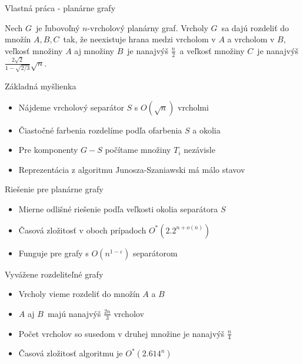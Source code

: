 \documentclass[slovak]{beamer}
\begin{document}
\begin{frame}{Vlastná práca - planárne grafy}
    \begin{theorem}
        Nech $G$ je ľubovoľný $n$-vrcholový planárny graf. Vrcholy $G$ sa dajú rozdeliť
        do množín $A, B, C$ tak, že neexistuje hrana medzi vrcholom v $A$ a vrcholom v $B$,
        veľkosť množiny $A$ aj množiny $B$ je nanajvýš $\frac{n}{2}$ a veľkosť množiny $C$ je nanajvýš
        $\frac{2\sqrt{2}}{1 - \sqrt{2/3}} \sqrt{n}$.
    \end{theorem}
\end{frame}

\begin{frame}{Základná myšlienka}
    \begin{itemize}
        \item Nájdeme vrcholový separátor $S$ s $O(\sqrt{n})$ vrcholmi
        \item Čiastočné farbenia rozdelíme podľa ofarbenia $S$ a okolia
        \item Pre komponenty $G - S$ počítame množiny $T_i$ nezávisle
        \item Reprezentácia z algoritmu Junosza-Szaniawski má málo stavov
    \end{itemize}
\end{frame}

\begin{frame}{Riešenie pre planárne grafy}
    \begin{itemize}
        \item Mierne odlišné riešenie podľa veľkosti okolia separátora $S$
        \item Časová zložitosť v oboch prípadoch $O^*(2.2^{n + o(n)})$
        \item Funguje pre grafy s $O(n^{1 - \varepsilon})$ separátorom
    \end{itemize}
\end{frame}

\begin{frame}{Vyvážene rozdeliteľné grafy}
    \begin{itemize}
        \item Vrcholy vieme rozdeliť do množín $A$ a $B$
        \item $A$ aj $B$ majú nanajvýš $\frac{2n}{3}$ vrcholov
        \item Počet vrcholov so susedom v druhej množine je nanajvýš $\frac{n}{4}$
        \item Časová zložitosť algoritmu je $O^*(2.614^n)$
    \end{itemize}

\end{frame}
\end{document}
